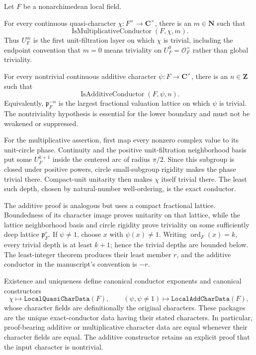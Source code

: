 \begin{theorem}
\label{mod:basic-characterconductorexistence}
Let $F$ be a nonarchimedean local field.

For every continuous quasi-character
$\chi:F^\times\to\mathbf C^\times$, there is an $m\in\mathbf N$
such that
\[
 \operatorname{IsMultiplicativeConductor}(F,\chi,m).
\]
Thus $U_F^m$ is the first unit-filtration layer on which $\chi$ is trivial,
including the endpoint convention that $m=0$ means triviality on
$U_F^0=\mathcal O_F^\times$ rather than global triviality.

For every nontrivial continuous additive character
$\psi:F\to\mathbf C^\times$, there is an $n\in\mathbf Z$ such
that
\[
 \operatorname{IsAdditiveConductor}(F,\psi,n).
\]
Equivalently, $\mathfrak p_F^{-n}$ is the largest fractional valuation
lattice on which $\psi$ is trivial.  The nontriviality hypothesis is essential
for the lower boundary and must not be weakened or suppressed.

For the multiplicative assertion, first map every nonzero complex value to
its unit-circle phase.  Continuity and the positive unit-filtration
neighborhood basis put some $U_F^{k+1}$ inside the centered arc of radius
$\pi/2$.  Since this subgroup is closed under positive powers, circle
small-subgroup rigidity makes the phase trivial there.  Compact-unit
unitarity then makes $\chi$ itself trivial there.  The least such depth,
chosen by natural-number well-ordering, is the exact conductor.

The additive proof is analogous but uses a compact fractional lattice.
Boundedness of its character image proves unitarity on that lattice, while
the lattice neighborhood basis and circle rigidity prove triviality on some
sufficiently deep lattice $\mathfrak p_F^r$.  If $\psi\ne1$, choose
$x$ with $\psi(x)\ne1$.  Writing $\operatorname{ord}_F(x)=k$, every trivial
depth is at least $k+1$; hence the trivial depths are bounded below.  The
least-integer theorem produces their least member $r$, and the additive
conductor in the manuscript's convention is $-r$.

Existence and uniqueness define canonical conductor exponents and canonical
constructors
\[
 \chi\longmapsto\texttt{LocalQuasiCharData}(F),\qquad
 (\psi,\psi\ne1)\longmapsto\texttt{LocalAddCharData}(F),
\]
whose character fields are definitionally the original characters.  These
packages are the unique exact-conductor data having their stated characters.
In particular, proof-bearing additive or multiplicative character data are
equal whenever their character fields are equal.  The additive constructor
retains an explicit proof that the input character is nontrivial.


\end{theorem}
